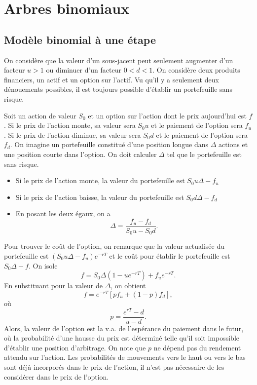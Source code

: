 \chapter{Arbres binomiaux}

\section{Modèle binomial à une étape}

On considère que la valeur d'un sous-jacent peut seulement augmenter d'un facteur $u>1$ ou diminuer d'un facteur $0<d<1$. On considère deux produits financiers, un actif et un option sur l'actif. Vu qu'il y a seulement deux dénouements possibles, il est toujours possible d'établir un portefeuille sans risque. 

Soit un action de valeur $S_0$ et un option sur l'action dont le prix aujourd'hui est $f$. Si le prix de l'action monte, sa valeur sera $S_0u$ et le paiement de l'option sera $f_u$. Si le prix de l'action diminue, sa valeur sera $S_0 d$ et le paiement de l'option sera $f_d$. On imagine un portefeuille constitué d'une position longue dans $\Delta$ actions et une position courte dans l'option. On doit calculer $\Delta$ tel que le portefeuille est sans risque. 

\begin{itemize}
	\item Si le prix de l'action monte, la valeur du portefeuille est $S_0u\Delta - f_u$
	\item Si le prix de l'action baisse, la valeur du portefeuille est $S_0d\Delta - f_d$
	\item En posant les deux égaux, on a 
	$$\Delta = \frac{f_u - f_d}{S_0 u - S_0 d}.$$
\end{itemize}

Pour trouver le coût de l'option, on remarque que la valeur actualisée du portefeuille est $(S_0u\Delta - f_u) e^{-rT}$ et le coût pour établir le portefeuille est $S_0 \Delta - f$. On isole $$f = S_0 \Delta(1-ue^{-rT}) + f_u e^{-rT}.$$
En substituant pour la valeur de $\Delta$, on obtient
$$f = e^{-rT}\left[p f_u + (1-p)f_d\right],$$
où $$p = \frac{e^{rT} - d}{u-d}.$$
Alors, la valeur de l'option est la v.a. de l'espérance du paiement dans le futur, où la probabilité d'une hausse du prix est déterminé telle qu'il soit impossible d'établir une position d'arbitrage. On note que $p$ ne dépend pas du rendement attendu sur l'action. Les probabilités de mouvements vers le haut ou vers le bas sont déjà incorporés dans le prix de l'action, il n'est pas nécessaire de les considérer dans le prix de l'option. 

